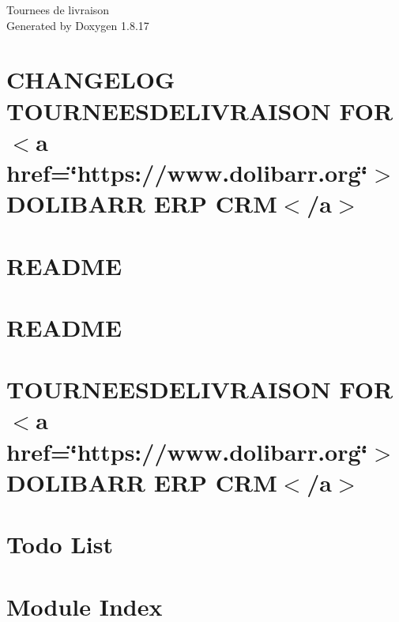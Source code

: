 \let\mypdfximage\pdfximage\def\pdfximage{\immediate\mypdfximage}\documentclass[twoside]{book}
\newcommand{\+}{\discretionary{\mbox{\scriptsize$\hookleftarrow$}}{}{}}
\newcommand{\clearemptydoublepage}{%
  \newpage{\pagestyle{empty}\cleardoublepage}%
}
\begin{document}
\hypersetup{pageanchor=false,
             bookmarksnumbered=true,
             pdfencoding=unicode
            }
\begin{titlepage}
\vspace*{7cm}
\begin{center}%
{\Large Tournees de livraison }\\
\vspace*{1cm}
{\large Generated by Doxygen 1.8.17}\\
\end{center}
\end{titlepage}
\clearemptydoublepage
{}
\tableofcontents
\clearemptydoublepage
{}
\hypersetup{pageanchor=true}

\chapter{C\+H\+A\+N\+G\+E\+L\+OG T\+O\+U\+R\+N\+E\+E\+S\+D\+E\+L\+I\+V\+R\+A\+I\+S\+ON F\+OR $<$a href=\char`\"{}https\+://www.\+dolibarr.\+org\char`\"{}$>$D\+O\+L\+I\+B\+A\+RR E\+RP C\+RM$<$/a$>$}
\label{md__change_log}

\chapter{R\+E\+A\+D\+ME}
\label{md_core_boxes__r_e_a_d_m_e}

\chapter{R\+E\+A\+D\+ME}
\label{md_core_triggers__r_e_a_d_m_e}

\chapter{T\+O\+U\+R\+N\+E\+E\+S\+D\+E\+L\+I\+V\+R\+A\+I\+S\+ON F\+OR $<$a href=\char`\"{}https\+://www.\+dolibarr.\+org\char`\"{}$>$D\+O\+L\+I\+B\+A\+RR E\+RP C\+RM$<$/a$>$}
\label{md__r_e_a_d_m_e}

\chapter{Todo List}
\label{todo}

\chapter{Module Index}

\end{document}
